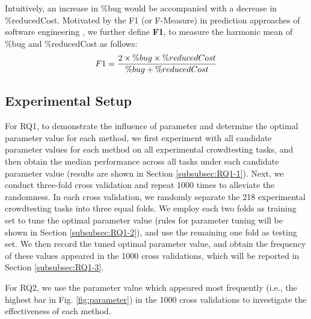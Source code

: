 \documentclass[sigconf,review, anonymous]{acmart}
\newcommand{\task}{218}
\begin{document}
Intuitively, an increase in \%bug would be accompanied with a decrease in \%reducedCost.
Motivated by the F1 (or F-Measure) in prediction approaches of software engineering \cite{nam2017heterogeneous,wang2017domain,wang2016towards}, we further define \textbf{F1}, to measure the harmonic mean of \%bug and \%reducedCost as follows: 
\begin{equation}
\footnotesize{ F1 = \frac{2 \times \%bug \times \%reducedCost}{\%bug + \%reducedCost} }
\end{equation}






\subsection{Experimental Setup}
\label{subsec:design_setup}

For RQ1, to demonstrate the influence of parameter and determine the optimal parameter value for each method, we first experiment with all candidate parameter values for each method on all experimental crowdtesting tasks,
and then obtain the median performance across all tasks under each candidate parameter value (results are shown in Section \ref{subsubsec:RQ1-1}).
Next, we conduct three-fold cross validation \cite{data_ming} and repeat 1000 times to alleviate the randomness.
In each cross validation, we randomly separate the {\task} experimental crowdtesting tasks into three equal folds.
We employ each two folds as training set to tune the optimal parameter value (rules for parameter tuning will be shown in Section \ref{subsubsec:RQ1-2}), and use the remaining one fold as testing set. 
We then record the tuned optimal parameter value, and obtain the frequency  of these values appeared in the 1000 cross validations, which will be reported in Section \ref{subsubsec:RQ1-3}.  


For RQ2, we use the parameter value which appeared most frequently (i.e., the highest bar in Fig. \ref{fig:parameter}) in the 1000 cross validations to investigate the effectiveness of each method.

% 
\end{document}
